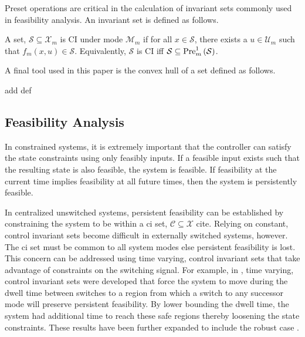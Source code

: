 Preset operations are critical in the calculation of invariant sets commonly used in feasibility analysis. An invariant set is defined as follows.
\begin{definition}\label{def:ci_set}
A set, $\mathcal{S}\subseteq\mathcal{X}_m$ is CI under mode $\mathcal{M}_m$ if for all $x\in\mathcal{S}$, there exists a $u\in\mathcal{U}_m$ such that $f_m(x,u)\in\mathcal{S}$. Equivalently, $\mathcal{S}$ is CI iff $\mathcal{S}\subseteq\Pre[m][1]{\mathcal{S}}$.
\end{definition}

A final tool used in this paper is the convex hull of a set defined as follows.
\begin{definition}
\alert{add def}
\end{definition}
\subsection{Feasibility Analysis}
In constrained systems, it is extremely important that the controller can satisfy the state constraints using only feasibly inputs. If a feasible input exists such that the resulting state is also feasible, the system is feasible. If feasibility at the current time implies feasibility at all future times, then the system is persistently feasible.

In centralized unswitched systems, persistent feasibility can be established by constraining the system to be within a \ac{ci} set, $\mathcal{C}\subseteq\mathcal{X}$ \alert{cite}. Relying on constant, control invariant sets become difficult in externally switched systems, however. The \ac{ci} set must be common to all system modes else persistent feasibility is lost. This concern can be addressed using time varying, control invariant sets that take advantage of constraints on the switching signal. For example, in \cite{Danielson2019,Santis2004}, time varying, control invariant sets were developed that force the system to move during the dwell time between switches to a region from which a switch to any successor mode will preserve persistent feasibility. By lower bounding the dwell time, the system had additional time to reach these safe regions thereby loosening the state constraints. These results have been further expanded to include the robust case \cite{Lavaei2021}.

